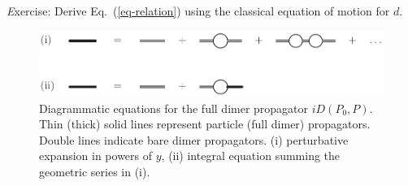 \begin{prob}
{\emph Exercise:} Derive Eq.~(\ref{eq-relation}) using the classical 
equation of motion for $d$.
\end{prob}

\begin{figure}[htb]
\bigskip
\centerline{\includegraphics*[width=12cm,angle=0]{fig_feynDimer.pdf}}
\medskip
\caption
{Diagrammatic equations for the full dimer propagator
$i D(P_0,P)$. Thin (thick)
solid lines represent particle (full dimer) propagators.
Double lines indicate bare dimer propagators.
(i) perturbative expansion in powers of $y$,
(ii) integral equation summing the geometric series in (i).}
\label{fig:bubbles}
\end{figure}

